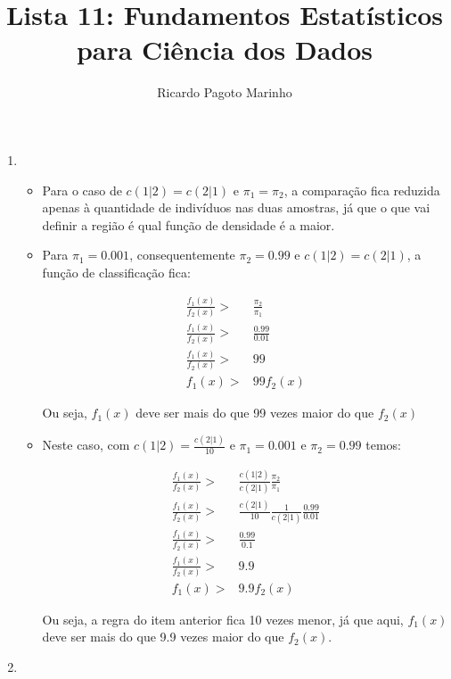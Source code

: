 \documentclass[11pt,a4paper]{book}
\title{Lista 11: Fundamentos Estatísticos para Ciência dos Dados}
\author{Ricardo Pagoto Marinho}
\begin{document}
\maketitle
	\begin{enumerate}
		\item
		\begin{itemize}
		
			\item
			
			Para o caso de $c(1|2)=c(2|1)$ e $\pi_1=\pi_2$, a comparação fica reduzida apenas à quantidade de indivíduos nas duas amostras, já que o que vai definir a região é qual função de densidade é a maior.
			
			\item 
			
			Para $\pi_1=0.001$, consequentemente $\pi_2=0.99$ e $c(1|2)=c(2|1)$, a função de classificação fica:
			
			\begin{eqnarray*}
				\frac{f_1(x)}{f_2(x)}>&\frac{\pi_2}{\pi_1}\\
				\frac{f_1(x)}{f_2(x)}>&\frac{0.99}{0.01}\\
				\frac{f_1(x)}{f_2(x)}>&99\\
				f_1(x)>&99f_2(x)
			\end{eqnarray*}
			
			Ou seja, $f_1(x)$ deve ser mais do que 99 vezes maior do que $f_2(x)$
			
			\item
			
			Neste caso, com $c(1|2)=\frac{c(2|1)}{10}$ e $\pi_1=0.001$ e $\pi_2=0.99$ temos: 
			
			\begin{eqnarray*}
				\frac{f_1(x)}{f_2(x)}>&\frac{c(1|2)}{c(2|1)}\frac{\pi_2}{\pi_1}\\
				\frac{f_1(x)}{f_2(x)}>&\frac{c(2|1)}{10}\frac{1}{c(2|1)}\frac{0.99}{0.01}\\
				\frac{f_1(x)}{f_2(x)}>&\frac{0.99}{0.1}\\
				\frac{f_1(x)}{f_2(x)}>&9.9\\
				f_1(x)>&9.9f_2(x)
			\end{eqnarray*}
			
			Ou seja, a regra do item anterior fica 10 vezes menor, já que aqui, $f_1(x)$ deve ser mais do que 9.9 vezes maior do que $f_2(x)$.
		\end{itemize}
		
		\item
		
		
	\end{enumerate}
\end{document}
